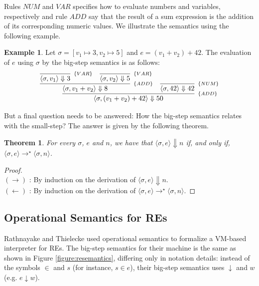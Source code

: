 \documentclass[oneside,12pt]{scrbook}
\newtheorem{Theorem}{Theorem}
\theoremstyle{definition}
\newtheorem{Example}{Example}
\theoremstyle{plain}
\theoremstyle{definition}
\begin{document}
Rules $NUM$ and $VAR$ specifies how to evaluate numbers and variables, respectively and rule
$ADD$ say that the result of a sum expression is the addition of its corresponding numeric values.
We illustrate the semantics using the following example.

\begin{Example}
	Let $\sigma = [v_1\mapsto 3, v_2\mapsto 5]$ and $e = (v_1 + v_2) + 42$. The evaluation of $e$ using $\sigma$
	by the big-step semantics is as follows:
	\[
	\infer[_{\{ADD\}}]
	{\langle \sigma, (v_1 + v_2) + 42 \rangle \Downarrow 50}
	{
		\infer[_{\{ADD\}}]
		{\langle \sigma, v_1 + v_2 \rangle \Downarrow 8}
		{
			\infer[_{\{VAR\}}]
			{\langle \sigma, v_1 \rangle \Downarrow 3}{} &
			\infer[_{\{VAR\}}]
			{\langle \sigma, v_2 \rangle \Downarrow 5}{}
		}
		&
		\infer[_{\{NUM\}}]
		{\langle \sigma, 42 \rangle \Downarrow 42}{}
	}
	\]
\end{Example}

But a final question needs to be answered: How the big-step semantics relates with the small-step?
The answer is given by the following theorem.

\begin{Theorem}
	For every $\sigma$, $e$ and $n$, we have that $\langle \sigma, e \rangle \Downarrow n$ if, and only if,
	$\langle \sigma, e \rangle \to^\star \langle \sigma, n \rangle$.
\end{Theorem}
\begin{proof} $\:$\\
	$(\to)$ : By induction on the derivation of $\langle \sigma, e \rangle \Downarrow n$. \\
	$(\leftarrow)$ : By induction on the derivation of $\langle \sigma, e \rangle \to^\star \langle \sigma, n \rangle$.
\end{proof}

\subsection{Operational Semantics for REs}\label{subsection:reoperationalsemantics}

Rathnayake and Thielecke \cite{Rathnayake2011} used operational semantics to formalize a VM-based interpreter for REs. The big-step semantics for their machine is the same as shown in Figure \ref{figure:resemantics}, differing only in notation details: instead of the symbols $\in$ and $s$ (for instance, $s \in e$), their big-step semantics uses $\downarrow$ and $w$ (e.g. $e \downarrow w$).
\end{document}

